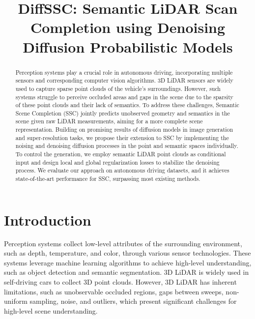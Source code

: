 \documentclass[conference]{IEEEtran}
\begin{document}
\title{DiffSSC: Semantic LiDAR Scan Completion using Denoising Diffusion Probabilistic Models}

\author{
}

\maketitle

\begin{abstract}
Perception systems play a crucial role in autonomous driving, incorporating multiple sensors and corresponding computer vision algorithms.
3D LiDAR sensors are widely used to capture sparse point clouds of the vehicle's surroundings.
However, such systems struggle to perceive occluded areas and gaps in the scene due to the sparsity of these point clouds and their lack of semantics.
To address these challenges, Semantic Scene Completion (SSC) jointly predicts unobserved geometry and semantics in the scene given raw LiDAR measurements, aiming for a more complete scene representation.
Building on promising results of diffusion models in image generation and super-resolution tasks, we propose their extension to SSC by implementing the noising and denoising diffusion processes in the point and semantic spaces individually.
To control the generation, we employ semantic LiDAR point clouds as conditional input and design local and global regularization losses to stabilize the denoising process.
We evaluate our approach on autonomous driving datasets, and it achieves state-of-the-art performance for SSC, surpassing most existing methods.
\end{abstract}

\section{Introduction}

Perception systems collect low-level attributes of the surrounding environment, such as depth, temperature, and color, through various sensor technologies.
These systems leverage machine learning algorithms to achieve high-level understanding, such as object detection and semantic segmentation.
3D LiDAR is widely used in self-driving cars to collect 3D point clouds.
However, 3D LiDAR has inherent limitations, such as unobservable occluded regions, gaps between sweeps, non-uniform sampling, noise, and outliers, which present significant challenges for high-level scene understanding.
\end{document}
